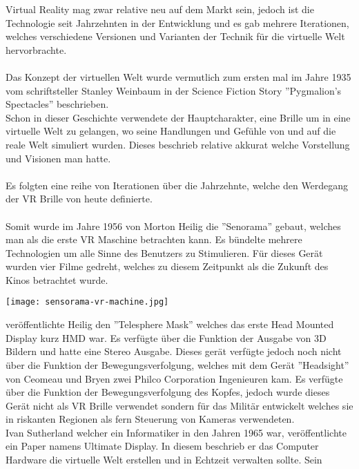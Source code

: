 
Virtual Reality mag zwar relative neu auf dem Markt sein, jedoch ist die Technologie seit Jahrzehnten in der Entwicklung und es gab mehrere
Iterationen, welches verschiedene Versionen und Varianten der Technik für die virtuelle Welt hervorbrachte. \\ \\
Das Konzept der virtuellen Welt wurde vermutlich zum ersten mal im Jahre 1935 vom schriftsteller Stanley Weinbaum in der Science Fiction
Story ''Pygmalion's Spectacles'' beschrieben.\\ 
Schon in dieser Geschichte verwendete der Hauptcharakter, eine Brille um in eine virtuelle Welt zu gelangen, wo seine Handlungen
und Gefühle von und auf die reale Welt simuliert wurden. Dieses beschrieb relative akkurat welche Vorstellung und Visionen man
hatte.\cite{virtualrealityhistory}\\ \\
Es folgten eine reihe von Iterationen über die Jahrzehnte, welche den Werdegang der VR Brille von heute definierte. \\ \\
Somit wurde im Jahre 1956 von Morton Heilig die ''Senorama'' gebaut, welches man als die erste VR Maschine betrachten kann. Es bündelte
mehrere Technologien um alle Sinne des Benutzers zu Stimulieren. Für dieses Gerät wurden vier Filme gedreht, welches zu diesem Zeitpunkt
als die Zukunft des Kinos betrachtet wurde.\cite{virtualrealityhistory} \\
\begin{center}
    \texttt{[image: sensorama-vr-machine.jpg]}
\end{center}
\newpage {} veröffentlichte Heilig den ''Telesphere Mask'' welches das erste Head Mounted Display kurz HMD war. Es verfügte über die
Funktion der Ausgabe von 3D Bildern und hatte eine Stereo Ausgabe. Dieses gerät verfügte jedoch noch nicht über die Funktion der
Bewegungsverfolgung, welches mit dem Gerät ''Headsight'' von Ceomeau und Bryen zwei Philco Corporation Ingenieuren kam. Es
verfügte über die Funktion der Bewegungsverfolgung des Kopfes, jedoch wurde dieses Gerät nicht als VR Brille verwendet sondern für das
Militär entwickelt welches sie in riskanten Regionen als fern Steuerung von Kameras verwendeten.\cite{virtualrealityhistory}\\
Ivan Sutherland welcher ein Informatiker in den Jahren 1965 war, veröffentlichte ein Paper namens Ultimate Display. In diesem beschrieb er
das Computer Hardware die virtuelle Welt erstellen und in Echtzeit verwalten sollte. Sein
